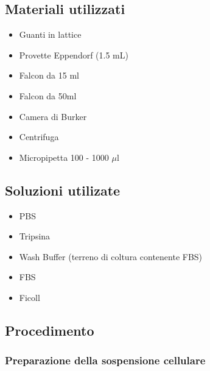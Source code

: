 \subsection{Materiali utilizzati}

\begin{itemize}
\item Guanti in lattice
\item Provette Eppendorf (1.5 mL)
\item Falcon da 15 ml
\item Falcon da 50ml
\item Camera di Burker
\item Centrifuga
\item Micropipetta 100 - 1000 $\mu$l

\end{itemize}

\subsection{Soluzioni utilizate}

\begin{itemize}

\item PBS
\item Tripsina
\item Wash Buffer (terreno di coltura contenente FBS)
\item FBS
\item Ficoll

\end{itemize}

\subsection{Procedimento}

\subsubsection{Preparazione della sospensione cellulare}

